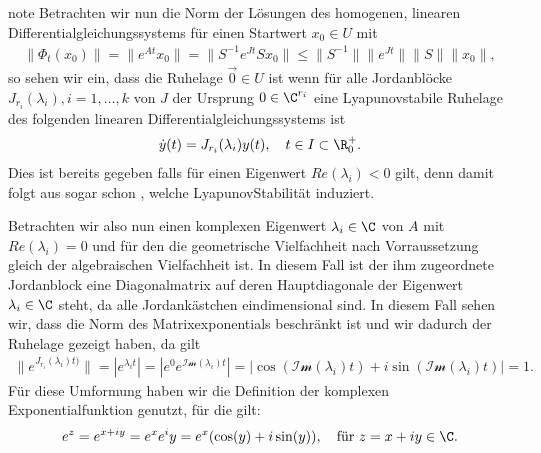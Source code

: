 \documentclass[letterpaper,10pt,german]{jupyterBook}
\begin{document}
\begin{sphinxadmonition}{note}
\sphinxAtStartPar
Betrachten wir nun die Norm der Lösungen des homogenen, linearen Differentialgleichungssystems für einen Startwert \(x_0 \in U\) mit
\begin{equation*}
\begin{split}\| \Phi_t(x_0) \| = \|e^{At}x_0\| = \|S^{-1}e^{Jt}S x_0\| \leq \|S^{-1}\| \|e^{Jt}\| \|S\| \|x_0\|,\end{split}
\end{equation*}
\sphinxAtStartPar
so sehen wir ein, dass die Ruhelage \(\vec{0} \in U\)  ist wenn für alle Jordanblöcke \(J_{r_i}(\lambda_i), i=1,\ldots,k\) von \(J\) der Ursprung \(0\in \C^{r_i}\) eine Lyapunov\sphinxhyphen{}stabile Ruhelage des folgenden linearen Differentialgleichungssystems ist
\begin{equation*}
\begin{split} \dot{y}(t) = J_{r_i}(\lambda_i) y(t), \quad t \in I \subset \R^+_0.\end{split}
\end{equation*}
\sphinxAtStartPar
Dies ist bereits gegeben falls für einen Eigenwert \(Re(\lambda_i)<0\) gilt, denn damit folgt aus {\hyperref[\detokenize{odestability/ruhelagen:thm:stablin}]{}} sogar schon , welche Lyapunov\sphinxhyphen{}Stabilität induziert.

\sphinxAtStartPar
Betrachten wir also nun einen komplexen Eigenwert \(\lambda_i \in \C\) von \(A\) mit \(Re(\lambda_i)=0\) und für den die geometrische Vielfachheit nach Vorraussetzung gleich der algebraischen Vielfachheit ist.
In diesem Fall ist der ihm zugeordnete Jordanblock eine Diagonalmatrix auf deren Hauptdiagonale der Eigenwert \(\lambda_i \in \C\) steht, da alle Jordankästchen eindimensional sind.
In diesem Fall sehen wir, dass die Norm des Matrixexponentials beschränkt ist und wir dadurch  der Ruhelage gezeigt haben, da gilt
\begin{equation*}
\begin{split}\|e^{J_{r_i}(\lambda_i)t)}\| = |e^{\lambda_i t}| = |e^0e^{\mathcal{Im}(\lambda_i) t}| = |\cos{(\mathcal{Im}(\lambda_i)t)} + i \sin{(\mathcal{Im}(\lambda_i)t)}| = 1.\end{split}
\end{equation*}
\sphinxAtStartPar
Für diese Umformung haben wir die Definition der komplexen Exponentialfunktion genutzt, für die gilt:
\begin{equation*}
\begin{split}e^z = e^{x+iy} = e^xe^iy = e^x(\cos(y) + i\sin(y)), \quad \text{für } z = x+iy \in \C.\end{split}
\end{equation*}\end{sphinxadmonition}
\end{document}
